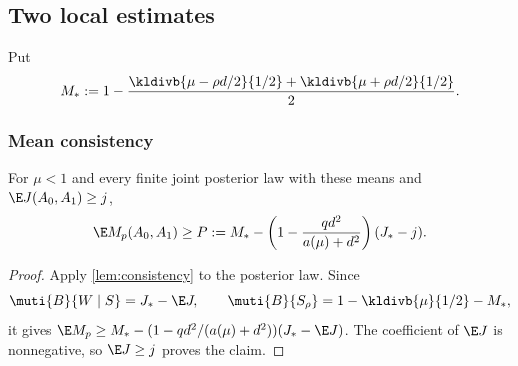 \subsection{Two local estimates}
Put
\[
 M_*:=1-\frac{\kldivb{\mu-\rho d/2}{1/2}+\kldivb{\mu+\rho d/2}{1/2}}2.
\]

\subsubsection*{Mean consistency}
\begin{lemma}\label{lem:app-consistency}
For $\mu<1$ and every finite joint posterior law with these means and $\E
J(A_0,A_1)\ge j$,
\begin{equation}\label{eq:app-Pbound}
 \E M_p(A_0,A_1)\ge
 P:=M_*-\left(1-\frac{qd^2}{a(\mu)+d^2}\right)(J_*-j).
\end{equation}
\end{lemma}
\begin{proof}
Apply \autoref{lem:consistency} to the posterior law. Since
\[
 \muti{B}{W\mid S}=J_*-\E J,\qquad
 \muti{B}{S_\rho}=1-\kldivb{\mu}{1/2}-M_*,
\]
it gives $\E M_p\ge M_*-(1-qd^2/(a(\mu)+d^2))(J_*-\E J)$.
The coefficient of $\E J$ is nonnegative, so $\E J\ge j$ proves the claim.
\end{proof}


